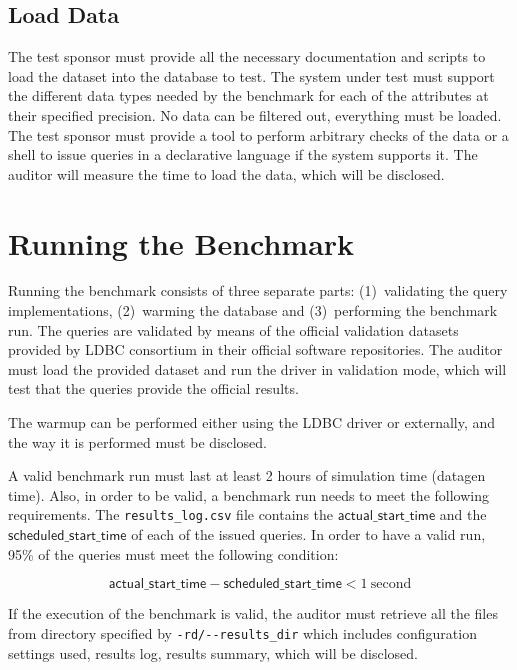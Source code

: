 \subsection{Load Data}

The test sponsor must provide all the necessary documentation and scripts
to load the dataset into the database to test. The system under test must
support the different data types needed by the benchmark for each of the
attributes at their specified precision. No data can be filtered out, everything
must be loaded.  The test sponsor must provide a tool to perform arbitrary
checks of the data or a shell to issue queries in a declarative language if the
system supports it. The auditor will measure the time to load the data, which
will be disclosed.

\section{Running the Benchmark}

Running the benchmark consists of three separate parts: (1)~validating the query
implementations, (2)~warming the database and (3)~performing the benchmark run. The
queries are validated by means of the official validation datasets provided by
LDBC consortium in their official software repositories. The auditor must load
the provided dataset and run the driver in validation mode, which will test
that the queries provide the official results.

The warmup can be performed either using the LDBC driver or externally, and the
way it is performed must be disclosed.

A valid benchmark run must last at least 2 hours of simulation time (datagen
time).  Also, in order to be valid, a benchmark run needs to meet the following
requirements. The \texttt{results\_log.csv} file contains the $\mathsf{actual\_start\_time}$ and the $\mathsf{scheduled\_start\_time}$ of each of the issued queries.  In order to have a valid
run, 95\% of the queries must meet the following condition:

\begin{equation*}
\mathsf{actual\_start\_time} - \mathsf{scheduled\_start\_time} < 1\
\mathrm{second}
\end{equation*}

If the execution of the benchmark is valid, the auditor must retrieve all the
files from directory specified by \verb|-rd/--results_dir| which includes
configuration settings used, results log, results summary, which will be
disclosed.


